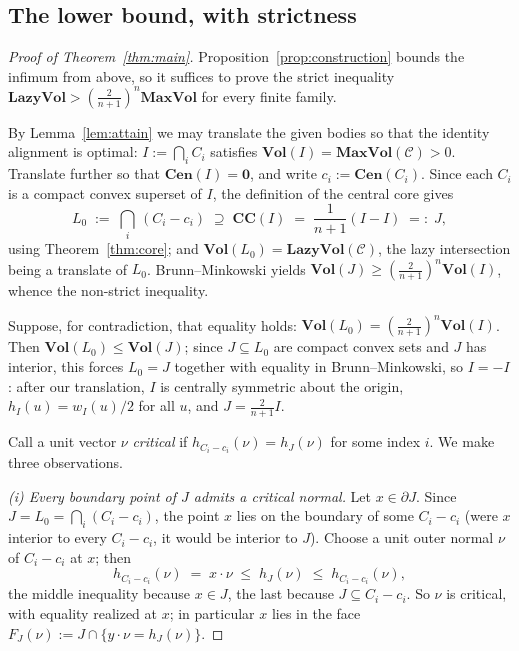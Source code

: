 \documentclass[12pt]{article}
\theoremstyle{definition}
\newcommand{\Vol}{\mathbf{Vol}}
\newcommand{\CC}{\mathbf{CC}}
\newcommand{\Cen}{\mathbf{Cen}}
\newcommand{\MV}{\mathbf{MaxVol}}
\newcommand{\LV}{\mathbf{LazyVol}}
\begin{document}
\subsection{The lower bound, with strictness}

\begin{proof}[Proof of Theorem~\ref{thm:main}]
Proposition~\ref{prop:construction} bounds the infimum from above, so it
suffices to prove the strict inequality
$\LV>\left(\tfrac{2}{n+1}\right)^n\MV$ for every finite family.

By Lemma~\ref{lem:attain} we may translate the given bodies so that the
identity alignment is optimal:
$I:=\bigcap_i C_i$ satisfies $\Vol(I)=\MV(\mathcal{C})>0$.  Translate
further so that $\Cen(I)=\mathbf 0$, and write $c_i:=\Cen(C_i)$.  Since
each $C_i$ is a compact convex superset of $I$, the definition of the
central core gives
\[
L_0\;:=\;\bigcap_i\,(C_i-c_i)\;\supseteq\;\CC(I)
\;=\;\frac{1}{n+1}(I-I)\;=:\;J,
\]
using Theorem~\ref{thm:core}; and $\Vol(L_0)=\LV(\mathcal{C})$, the lazy
intersection being a translate of $L_0$.  Brunn--Minkowski yields
$\Vol(J)\ge\left(\tfrac{2}{n+1}\right)^n\Vol(I)$, whence the
non-strict inequality.

Suppose, for contradiction, that equality holds:
$\Vol(L_0)=\left(\tfrac{2}{n+1}\right)^n\Vol(I)$.  Then
$\Vol(L_0)\le\Vol(J)$; since $J\subseteq L_0$ are compact convex sets
and $J$ has interior, this forces $L_0=J$ together with equality in
Brunn--Minkowski, so $I=-I$: after our translation, $I$ is centrally
symmetric about the origin, $h_I(u)=w_I(u)/2$ for all $u$, and
$J=\frac{2}{n+1}I$.

Call a unit vector $\nu$ {\em critical} if
$h_{C_i-c_i}(\nu)=h_J(\nu)$ for some index $i$.  We make three
observations.

\smallskip\noindent
{\em (i) Every boundary point of $J$ admits a critical normal.}
Let $x\in\partial J$.  Since $J=L_0=\bigcap_i(C_i-c_i)$, the point $x$
lies on the boundary of some $C_i-c_i$ (were $x$ interior to every
$C_i-c_i$, it would be interior to $J$).  Choose a unit outer normal
$\nu$ of $C_i-c_i$ at $x$; then
\[
h_{C_i-c_i}(\nu)\;=\;x\cdot\nu\;\le\;h_J(\nu)\;\le\;h_{C_i-c_i}(\nu),
\]
the middle inequality because $x\in J$, the last because
$J\subseteq C_i-c_i$.  So $\nu$ is critical, with equality realized at
$x$; in particular $x$ lies in the face
$F_J(\nu):=J\cap\{y\cdot\nu=h_J(\nu)\}$.


\end{proof}
\end{document}
